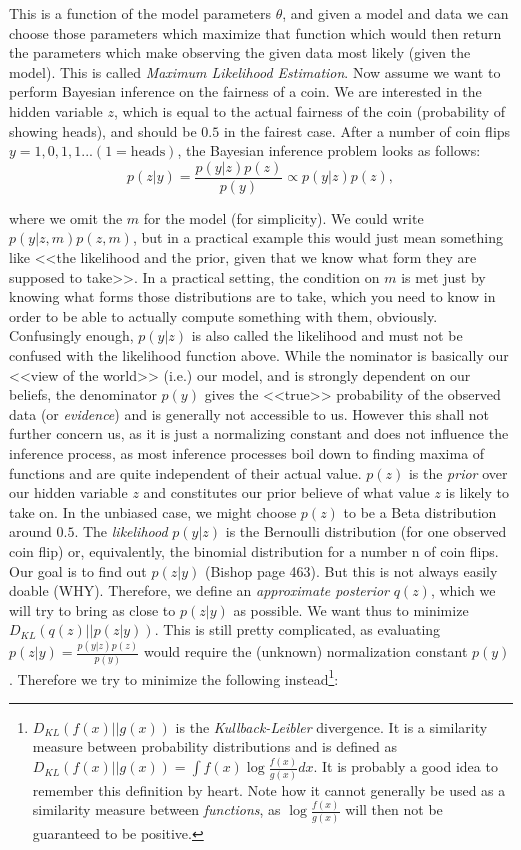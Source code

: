This is a function of the model parameters $\theta$, and given a model and data we can choose those parameters which maximize that function which would then return the parameters which make observing the given data most likely (given the model). This is called \textit{Maximum Likelihood Estimation}. Now assume we want to perform Bayesian inference on the fairness of a coin. We are interested in the hidden variable $z$, which is equal to the actual fairness of the coin (probability of showing heads), and should be $0.5$ in the fairest case. After a number of coin flips $y={1,0,1,1...} (1=\text{heads})$, the Bayesian inference problem looks as follows: \\

\begin{equation}
p(z|y)= \frac{p(y|z)p(z)}{p(y)} \propto p(y|z)p(z),
\end{equation}

\noindent where we omit the $m$ for the model (for simplicity). We could write $p(y|z,m)p(z,m)$, but in a practical example this would just mean something like <<the likelihood and the prior, given that we know what form they are supposed to take>>. In a practical setting, the condition on $m$ is met just by knowing what forms those distributions are to take, which you need to know in order to be able to actually compute something with them, obviously. Confusingly enough, $p(y|z)$ is also called the likelihood and must not be confused with the likelihood function above. While the nominator is basically our <<view of the world>> (i.e.) our model, and is strongly dependent on our beliefs, the denominator $p(y)$ gives the <<true>> probability of the observed data (or \textit{evidence}) and is generally not accessible to us. However this shall not further concern us, as it is just a normalizing constant and does not influence the inference process, as most inference processes boil down to finding maxima of functions and are quite independent of their actual value. $p(z)$ is the \textit{prior} over our hidden variable $z$ and constitutes our prior believe of what value $z$ is likely to take on. In the unbiased case, we might choose $p(z)$ to be a Beta distribution around $0.5$. The \textit{likelihood} $p(y|z)$ is the Bernoulli distribution (for one observed coin flip) or, equivalently, the binomial distribution for a number n of coin flips. Our goal is to find out $p(z|y)$ (Bishop page 463). But this is not always easily doable (WHY). Therefore, we define an \textit{approximate posterior} $q(z)$, which we will try to bring as close to $p(z|y)$ as possible. We want thus to minimize $D_{KL}(q(z)||p(z|y))$. This is still pretty complicated, as evaluating $p(z|y)=\frac{p(y|z)p(z)}{p(y)}$ would require the (unknown) normalization constant $p(y)$. Therefore we try to minimize the following instead\footnote{$D_{KL}(f(x)||g(x))$ is the \textit{Kullback-Leibler} divergence. It is a similarity measure between probability distributions and is defined as $D_{KL}(f(x)||g(x))= \int f(x)\log\frac{f(x)}{g(x)} dx$. It is probably a good idea to remember this definition by heart. Note how it cannot generally be used as a similarity measure between \textit{functions}, as $\log\frac{f(x)}{g(x)}$ will then not be guaranteed to be positive.}:

